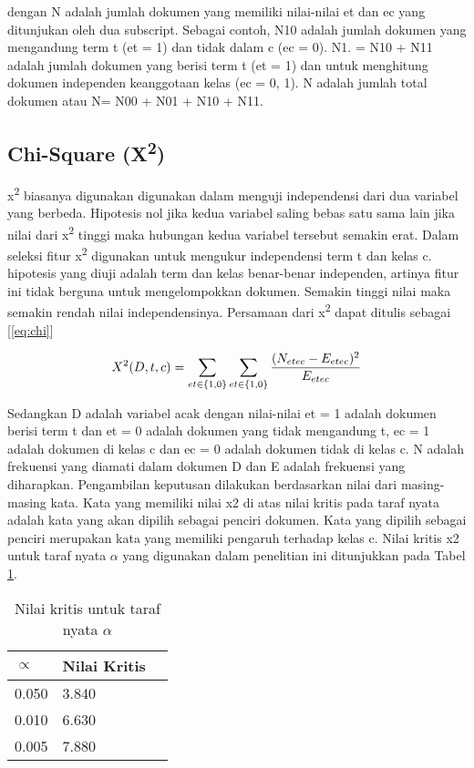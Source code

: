 dengan N adalah jumlah dokumen yang memiliki nilai-nilai et dan ec yang ditunjukan oleh dua subscript. Sebagai contoh, N10 adalah jumlah dokumen yang mengandung term t (et = 1) dan tidak dalam c (ec = 0). N1. = N10 + N11 adalah jumlah dokumen yang berisi term t (et = 1) dan untuk menghitung dokumen independen keanggotaan kelas (ec = {0, 1}). N adalah jumlah total dokumen atau N= N00 + N01 + N10 + N11.

\subsection*{Chi-Square (X\textsuperscript{2})}
x\textsuperscript{2} biasanya digunakan digunakan dalam menguji independensi dari dua variabel  yang berbeda. Hipotesis nol jika kedua variabel saling bebas satu sama lain jika nilai dari x\textsuperscript{2} tinggi maka hubungan kedua variabel tersebut semakin erat. Dalam seleksi fitur x\textsuperscript{2} digunakan untuk mengukur independensi term t dan kelas c. hipotesis yang diuji adalah term dan kelas benar-benar independen, artinya fitur ini tidak berguna untuk mengelompokkan dokumen. Semakin tinggi nilai maka semakin rendah nilai independensinya. Persamaan dari x\textsuperscript{2}  dapat ditulis sebagai [\ref{eq:chi}]

\begin{equation}
	\begin{split}
		\tiny
		X^2(D, t, c) = \sum\limits_{et\in\{1,0\}}\sum\limits_{et\in\{1,0\}} \frac{(N_{etec} - E_{etec})^2}{E_{etec}}
		\label{eq:chi}
		\normalsize
	\end{split}
\end{equation}

Sedangkan D adalah variabel acak dengan nilai-nilai et = 1 adalah dokumen berisi term t dan et = 0 adalah dokumen yang tidak mengandung t, ec = 1 adalah dokumen di kelas c dan ec = 0 adalah dokumen tidak di kelas c. N adalah frekuensi yang diamati dalam dokumen D dan E adalah frekuensi yang diharapkan. Pengambilan keputusan dilakukan berdasarkan nilai dari masing-masing kata. Kata yang memiliki nilai x2  di atas nilai kritis pada taraf nyata adalah kata yang akan dipilih sebagai penciri dokumen. Kata yang dipilih sebagai penciri merupakan kata yang memiliki pengaruh terhadap kelas c. Nilai kritis  x2  untuk taraf nyata  $ \alpha $ yang digunakan dalam penelitian ini ditunjukkan pada Tabel  \ref{tab:chisquare}.

\begin{table}[hbt]
	\caption{Nilai kritis untuk taraf nyata $ \alpha $}
	\centering
	\begin{tabular}{llr}
		\toprule
		$ \propto $ & Nilai Kritis \\
		\midrule
		0.050 & 3.840 \\
		0.010 & 6.630 \\
		0.005 & 7.880 \\
		\bottomrule
	\end{tabular}
	\label{tab:chisquare}
\end{table}

